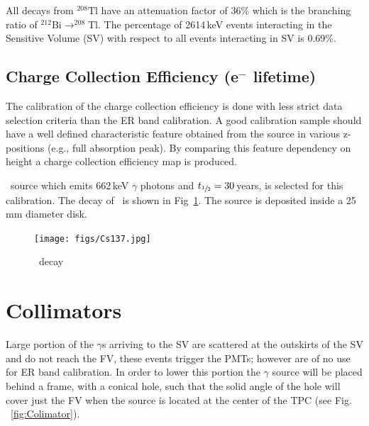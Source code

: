 All decays from $^{208}\mathrm{Tl}$ have an attenuation factor of 36\% which is the branching ratio of $^{212}\mathrm{Bi} \rightarrow ^{208}\mathrm{Tl}$.
The percentage of 2614\,keV events interacting in the Sensitive Volume (SV) with respect to all events interacting in SV is 0.69\%.

\subsection{Charge Collection Efficiency (e$^-$ lifetime)}
The calibration of the charge collection efficiency is done with less strict data selection criteria than the ER band calibration. A good calibration sample  should have a well defined characteristic feature obtained from the source in various z-positions (e.g., full absorption peak). By comparing this feature dependency on height a charge collection efficiency map is produced.

\Cs\ source which emits 662\,keV $\gamma$ photons and $t_{\sfrac{1}{2}} = 30$\,years, is selected for this calibration. The decay of \Cs\ is shown in Fig~\ref{fig:Cs}. The source is deposited inside a 25\,mm diameter disk. 


\begin{figure}
	\begin{center}
	\texttt{[image: figs/Cs137.jpg]}%
		\caption{\label{fig:Cs} \Cs\ decay}
		\end{center}
	
	\end{figure} 

\section{Collimators} \label{sec:Col}
 
Large portion of the $\gamma$s arriving to the SV are scattered at the outskirts of the SV and do not reach the FV, these events trigger the PMTs; however are of no use for ER band calibration. In order to lower this portion the $\gamma$ source will be placed behind a frame, with a conical hole, such that the solid angle of the hole will cover just the FV when the source is located at the center of the TPC (see Fig. ~\ref{fig:Colimator}). 

